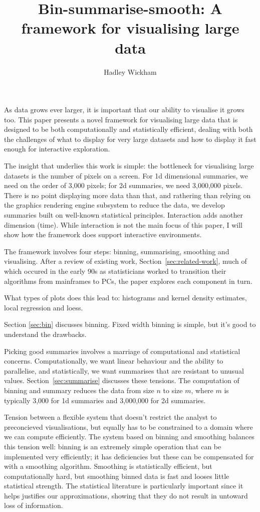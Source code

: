 \documentclass[journal]{vgtc}                %
\title{Bin-summarise-smooth: A framework for visualising large data}
\author{Hadley Wickham}
\begin{document}

\maketitle

As data grows ever larger, it is important that our ability to visualise it grows too. This paper presents a novel framework for visualising large data that is designed to be both computationally and statistically efficient, dealing with both the challenges of what to display for very large datasets and how to display it fast enough for interactive exploration.

The insight that underlies this work is simple: the bottleneck for visualising large datasets is the number of pixels on a screen. For 1d dimensional summaries, we need on the order of 3,000 pixels; for 2d summaries, we need 3,000,000 pixels. There is no point displaying more data than that, and rathering than relying on the graphics rendering engine subsystem to reduce the data, we develop summaries built on well-known statistical principles. Interaction adds another dimension (time). While interaction is not the main focus of this paper, I will show how the framework does support interactive environments.

The framework involves four steps: binning, summarising, smoothing and visualising. After a review of existing work, Section~\ref{sec:related-work}, much of which occured in the early 90s as statisticians worked to transition their algorithms from mainframes to PCs, the paper explores each component in turn.

What types of plots does this lead to: histograms and kernel density estimates, local regression and loess.

Section \ref{sec:bin} discusses binning. Fixed width binning is simple, but it's good to understand the drawbacks.

Picking good summaries involves a marriage of computational and statistical  concerns. Computationally, we want linear behaviour and the ability to parallelise, and statistically, we want summarises that are resistant to unusual values. Section~\ref{sec:summarise} discusses these tensions. The computation of binning and summary reduces the data from size $n$ to size $m$, where $m$ is typically 3,000 for 1d summaries and 3,000,000 for 2d summaries.

Tension between a flexible system that doesn't restrict the analyst to preconcieved visualisations, but equally has to be constrained to a domain where we can compute efficiently. The system based on binning and smoothing balances this tension well: binning is an extremely simple operation that can be implemented very efficiently; it has deficiencies but these can be compensated for with a smoothing algorithm. Smoothing is statistically efficient, but computationally hard, but smoothing binned data is fast and looses little statistical strength. The statistical literature is particularly important since it helps justifies our approximations, showing that they do not result in untoward loss of information.
\end{document}
